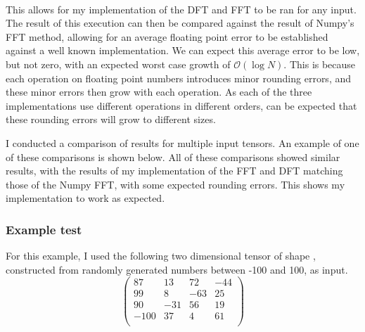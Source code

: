 \begin{code}
%
\\[\AgdaEmptyExtraSkip]%
\>[0]\AgdaSpace{}%
\AgdaSymbol{:}\AgdaSpace{}%
\AgdaSpace{}%
\AgdaSpace{}%
\AgdaSpace{}%
\AgdaSpace{}%
\AgdaSpace{}%
\AgdaSymbol{\{}\AgdaSymbol{\}}\AgdaSpace{}%
\<%
\\
\>[0]\AgdaSpace{}%
\AgdaSpace{}%
\AgdaSymbol{=}\AgdaSpace{}%
\<%
\\
\>[0][@{}l@{\AgdaIndent{0}}]%
\>[2]%
\>[24]\<%
\\
%
\>[2]%
\>[24]\<%
\\
%
\>[2]%
\>[24]\<%
\\
%
\>[2]%
\>[24]\<%
\end{code}

This allows for my implementation of the DFT and FFT to be ran for any input.
The result of this execution can then be compared against the result of Numpy's 
FFT method, allowing for an average floating point error to be established 
against a well known implementation.
We can expect this average error to be low, but not zero, with an expected worst 
case growth of $\mathcal{O}\left(\log N\right)$\cite{FFT4Profit}.
This is because each operation on floating point numbers introduces minor
rounding errors, and these minor errors then grow with each operation.
As each of the three implementations use different operations in different
orders, can be expected that these rounding errors will grow to different sizes.

I conducted a comparison of results for multiple input tensors.
An example of one of these comparisons is shown below.
All of these comparisons showed similar results, with the results of my 
implementation of the FFT and DFT matching those of the Numpy FFT, 
with some expected rounding errors.
This shows my implementation to work as expected.

\subsubsection{Example test}
For this example, I used the following two dimensional tensor of shape 
, constructed from randomly generated numbers between 
-100 and 100, as input.
\[
\begin{pmatrix}
   87  &  13 &  72 & -44 \\
   99  &   8 & -63 &  25 \\
   90  & -31 &  56 &  19 \\
  -100 &  37 &  4  &  61 \\
\end{pmatrix}
\]


